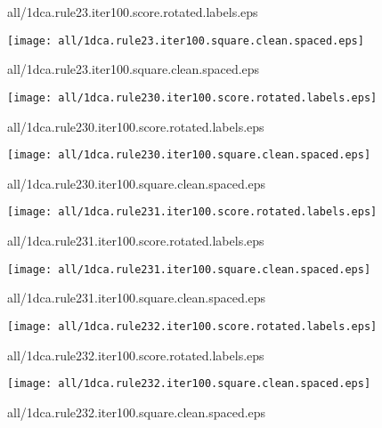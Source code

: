 \documentclass{article}
\begin{document}
{\footnotesize all/1dca.rule23.iter100.score.rotated.labels.eps}
\begin{center}
\begin{minipage}{\textwidth}
\texttt{[image: all/1dca.rule23.iter100.square.clean.spaced.eps]}
\end{minipage}
\end{center}
{\footnotesize all/1dca.rule23.iter100.square.clean.spaced.eps}
\begin{center}
\begin{minipage}{\textwidth}
\texttt{[image: all/1dca.rule230.iter100.score.rotated.labels.eps]}
\end{minipage}
\end{center}
{\footnotesize all/1dca.rule230.iter100.score.rotated.labels.eps}
\begin{center}
\begin{minipage}{\textwidth}
\texttt{[image: all/1dca.rule230.iter100.square.clean.spaced.eps]}
\end{minipage}
\end{center}
{\footnotesize all/1dca.rule230.iter100.square.clean.spaced.eps}
\begin{center}
\begin{minipage}{\textwidth}
\texttt{[image: all/1dca.rule231.iter100.score.rotated.labels.eps]}
\end{minipage}
\end{center}
{\footnotesize all/1dca.rule231.iter100.score.rotated.labels.eps}
\begin{center}
\begin{minipage}{\textwidth}
\texttt{[image: all/1dca.rule231.iter100.square.clean.spaced.eps]}
\end{minipage}
\end{center}
{\footnotesize all/1dca.rule231.iter100.square.clean.spaced.eps}
\begin{center}
\begin{minipage}{\textwidth}
\texttt{[image: all/1dca.rule232.iter100.score.rotated.labels.eps]}
\end{minipage}
\end{center}
{\footnotesize all/1dca.rule232.iter100.score.rotated.labels.eps}
\begin{center}
\begin{minipage}{\textwidth}
\texttt{[image: all/1dca.rule232.iter100.square.clean.spaced.eps]}
\end{minipage}
\end{center}
{\footnotesize all/1dca.rule232.iter100.square.clean.spaced.eps}
\end{document}
